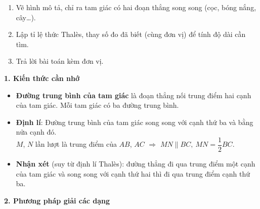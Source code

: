 \begin{enumerate}
\item Vẽ hình mô tả, chỉ ra tam giác có hai đoạn thẳng song song (cọc, bóng nắng, cây\dots).
\item Lập tỉ lệ thức Thalès, thay số đo đã biết (cùng đơn vị) để tính độ dài cần tìm.
\item Trả lời bài toán kèm đơn vị.
\end{enumerate}

\par{}\par\smallskip
\textbf{1. Kiến thức cần nhớ}
\begin{itemize}
\item \textbf{Đường trung bình của tam giác} là đoạn thẳng nối trung điểm hai cạnh của tam giác. Mỗi tam giác có ba đường trung bình.
\item \textbf{Định lí}: Đường trung bình của tam giác song song với cạnh thứ ba và bằng nửa cạnh đó.\\
$M$, $N$ lần lượt là trung điểm của $AB$, $AC$ $\Rightarrow$ $\boxed{MN\parallel BC,\ MN=\dfrac12BC}$.
\item \textbf{Nhận xét} (suy từ định lí Thalès): đường thẳng đi qua trung điểm một cạnh của tam giác và song song với cạnh thứ hai thì đi qua trung điểm cạnh thứ ba.
\end{itemize}

\textbf{2. Phương pháp giải các dạng}
